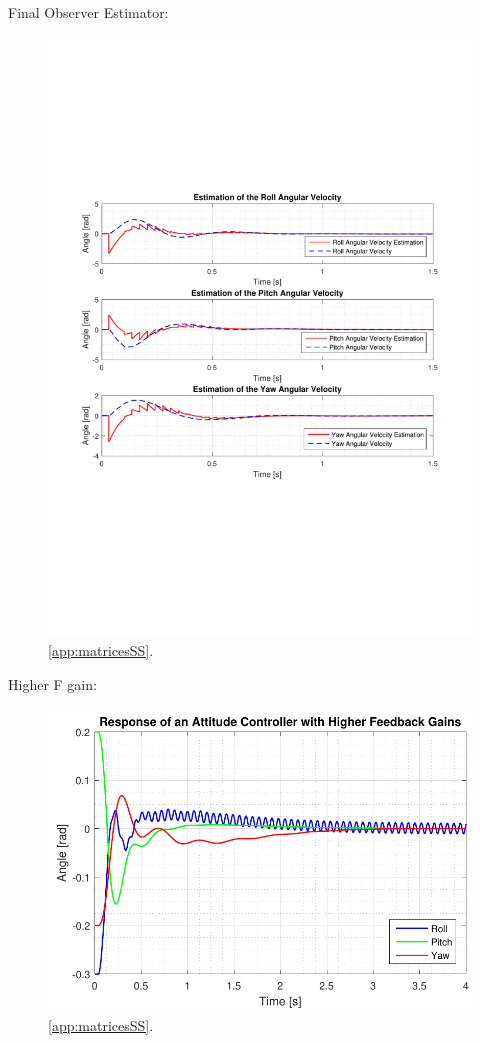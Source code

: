 Final Observer Estimator:

\begin{figure}[H]
	\centering
	\includegraphics[scale=0.8]{figures/ssObsFinal.pdf}
	\caption{\autoref{app:matricesSS}.}
	\label{fig:TranslationalControlDiagram}
\end{figure}

Higher F gain:

\begin{figure}[H]
	\centering
	\includegraphics[scale=1]{figures/ssEqBad.pdf}
	\caption{\autoref{app:matricesSS}.}
	\label{fig:TranslationalControlDiagram}
\end{figure}

